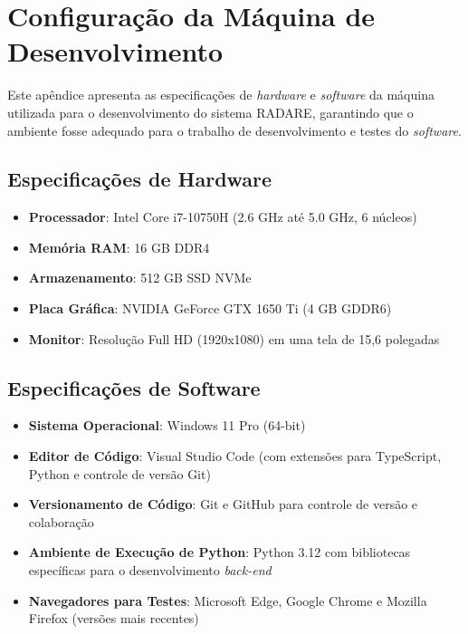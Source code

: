 \chapter{Configuração da Máquina de Desenvolvimento}
\label{Ap:configuracaoMaquina}

Este apêndice apresenta as especificações de \textit{hardware} e \textit{software} da máquina utilizada para o desenvolvimento do sistema RADARE, garantindo que o ambiente fosse adequado para o trabalho de desenvolvimento e testes do \textit{software}.

\section{Especificações de Hardware}
\begin{itemize}
    \item \textbf{Processador}: Intel Core i7-10750H (2.6 GHz até 5.0 GHz, 6 núcleos)
    \item \textbf{Memória RAM}: 16 GB DDR4
    \item \textbf{Armazenamento}: 512 GB SSD NVMe
    \item \textbf{Placa Gráfica}: NVIDIA GeForce GTX 1650 Ti (4 GB GDDR6)
    \item \textbf{Monitor}: Resolução Full HD (1920x1080) em uma tela de 15,6 polegadas
\end{itemize}

\section{Especificações de Software}
\begin{itemize}
    \item \textbf{Sistema Operacional}: Windows 11 Pro (64-bit)
    \item \textbf{Editor de Código}: Visual Studio Code (com extensões para TypeScript, Python e controle de versão Git)
    \item \textbf{Versionamento de Código}: Git e GitHub para controle de versão e colaboração
    \item \textbf{Ambiente de Execução de Python}: Python 3.12 com bibliotecas específicas para o desenvolvimento \textit{back-end}
    \item \textbf{Navegadores para Testes}: Microsoft Edge, Google Chrome e Mozilla Firefox (versões mais recentes)
\end{itemize}

